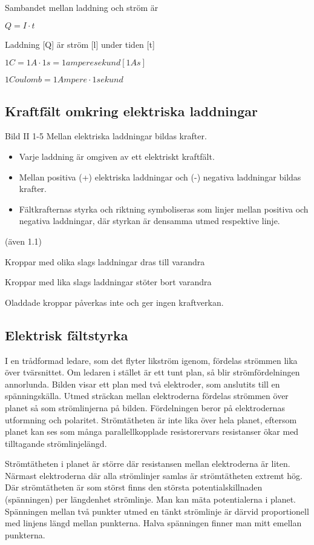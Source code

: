 Sambandet mellan laddning och ström är

$Q = I \cdot t$

Laddning [Q] är ström [l] under tiden [t]

$1 C= 1 A ·1 s= 1 amperesekund [1 As]$

$1 Coulomb = 1 Ampere·1 sekund$

\subsection{Kraftfält omkring elektriska laddningar}

Bild II 1-5
Mellan elektriska laddningar bildas krafter.

\begin{itemize}
\item Varje laddning är omgiven av ett elektriskt kraftfält.
\item Mellan positiva (+) elektriska laddningar
och (-) negativa laddningar bildas krafter.
\item Fältkrafternas styrka och riktning symboliseras som linjer mellan positiva och
negativa laddningar, där styrkan är densamma utmed respektive linje.
\end{itemize}

(även 1.1)

Kroppar med olika slags laddningar dras
till varandra

Kroppar med lika slags laddningar stöter bort varandra

Oladdade kroppar påverkas inte och ger ingen kraftverkan.

\subsection{Elektrisk fältstyrka}

I en trådformad ledare, som det flyter likström igenom, fördelas strömmen lika över
tvärsnittet. Om ledaren i stället är ett tunt plan, så blir strömfördelningen annorlunda.
Bilden visar ett plan med två elektroder, som anslutits till en spänningskälla. Utmed
sträckan mellan elektroderna fördelas strömmen över planet så som strömlinjerna på bilden.
Fördelningen beror på elektrodernas utformning och polaritet. Strömtätheten är inte lika
över hela planet, eftersom planet kan ses som många parallellkopplade resistorervars
resistanser ökar med tilltagande strömlinjelängd.

Strömtätheten i planet är större där resistansen mellan elektroderna är liten. Närmast
elektroderna där alla strömlinjer samlas är strömtätheten extremt hög. Där strömtätheten
är som störst finns den största potentialskillnaden (spänningen) per längdenhet
strömlinje. Man kan mäta potentialerna i planet. Spänningen mellan två punkter utmed en
tänkt strömlinje är därvid proportionell med linjens längd mellan punkterna. Halva
spänningen finner man mitt emellan punkterna.

